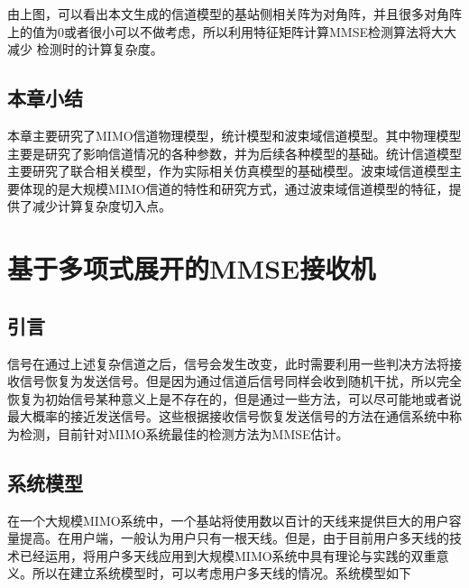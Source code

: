 \documentclass[bachelor,nocolorlinks, printoneside]{seuthesis} %
\begin{document}
\begin{Main}
由上图，可以看出本文生成的信道模型的基站侧相关阵为对角阵，并且很多对角阵上的值为0或者很小可以不做考虑，所以利用特征矩阵计算MMSE检测算法将大大减少
检测时的计算复杂度。

\section{本章小结}
本章主要研究了MIMO信道物理模型，统计模型和波束域信道模型。其中物理模型主要是研究了影响信道情况的各种参数，并为后续各种模型的基础。统计信道模型主要研究了联合相关模型，作为实际相关仿真模型的基础模型。波束域信道模型主要体现的是大规模MIMO信道的特性和研究方式，通过波束域信道模型的特征，提供了减少计算复杂度切入点。

\chapter{基于多项式展开的MMSE接收机}
\section{引言}
信号在通过上述复杂信道之后，信号会发生改变，此时需要利用一些判决方法将接收信号恢复为发送信号。但是因为通过信道后信号同样会收到随机干扰，所以完全恢复为初始信号某种意义上是不存在的，但是通过一些方法，可以尽可能地或者说最大概率的接近发送信号。这些根据接收信号恢复发送信号的方法在通信系统中称为检测，目前针对MIMO系统最佳的检测方法为MMSE估计。
\section{系统模型}
在一个大规模MIMO系统中，一个基站将使用数以百计的天线来提供巨大的用户容量提高。在用户端，一般认为用户只有一根天线。但是，由于目前用户多天线的技术已经运用，将用户多天线应用到大规模MIMO系统中具有理论与实践的双重意义。所以在建立系统模型时，可以考虑用户多天线的情况。系统模型如下


\end{Main}
\end{document}

